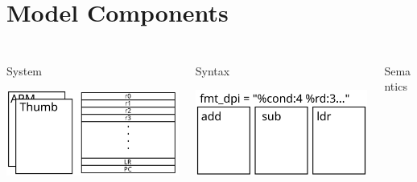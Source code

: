 \section{Model Components}
\subsection{}

\newsavebox{\modelcomponentsbox}
\begin{lrbox}{\modelcomponentsbox}
\begin{columns}
\begin{column}{0.25\textwidth}
\centering
System

\bigskip

\includegraphics[width=\textwidth]{../intro-talk/figures/component-system}
\end{column}
\begin{column}{0.25\textwidth}
\centering
Syntax

\bigskip

\includegraphics[width=\textwidth]{../intro-talk/figures/component-syntax}
\end{column}
\begin{column}{0.25\textwidth}
\centering
Semantics


\end{column}
\end{columns}
\end{lrbox}
